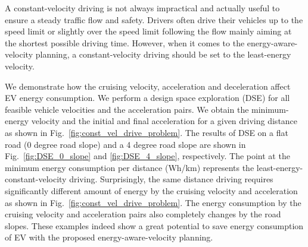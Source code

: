 \documentclass{IEEEtran}
\begin{document}
A constant-velocity driving is not always impractical and actually  useful to ensure a steady traffic flow and safety. Drivers often drive their vehicles up to the speed limit or slightly over the speed limit following the flow mainly aiming at the shortest possible driving time. However, when it comes to the energy-aware-velocity planning, a constant-velocity driving should be set to the least-energy velocity. 

We demonstrate how the cruising velocity, acceleration and deceleration affect EV energy consumption. We perform a design space exploration (DSE) for all feasible vehicle velocities and the acceleration pairs. We obtain the minimum-energy velocity and the initial and final acceleration for a given driving distance  as shown in Fig.~\ref{fig:const_vel_drive_problem}. The results of DSE on a flat road (0 degree road slope) and a 4 degree road slope are shown in Fig.~\ref{fig:DSE_0_slope} and \ref{fig:DSE_4_slope}, respectively. The point at the minimum energy consumption per distance (Wh/km) represents the least-energy-constant-velocity driving. Surprisingly, the same distance driving requires significantly different amount of energy by the cruising velocity and acceleration as shown in Fig.~\ref{fig:const_vel_drive_problem}. The energy consumption by the cruising velocity and acceleration pairs also completely changes by the road slopes. These examples indeed show a great potential to save energy consumption of EV with the proposed energy-aware-velocity planning.
\end{document}

